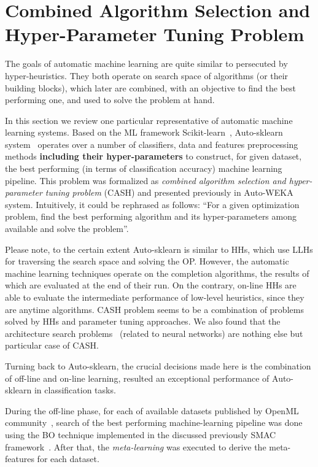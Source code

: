 \section{Combined Algorithm Selection and Hyper-Parameter Tuning Problem}\label{bg: section cash}
The goals of automatic machine learning are quite similar to persecuted by hyper-heuristics. They both operate on search space of algorithms (or their building blocks), which later are combined, with an objective to find the best performing one, and used to solve the problem at hand. 

In this section we review one particular representative of automatic machine learning systems.
Based on the ML framework Scikit-learn~\cite{scikit-learn}, Auto-sklearn system~\cite{feurer2015efficient} operates over a number of classifiers, data and features preprocessing methods \textbf{including their hyper-parameters} to construct, for given dataset, the best performing (in terms of classification accuracy) machine learning pipeline.
This problem was formalized as \textit{combined algorithm selection and hyper-parameter tuning problem} (CASH) and presented previously in Auto-WEKA~\cite{thornton2013auto} system. Intuitively, it could be rephrased as follows: ``For a given optimization problem, find the best performing algorithm and its hyper-parameters among available and solve the problem''. 

Please note, to the certain extent Auto-sklearn is similar to HHs, which use LLHs for traversing the search space and solving the OP. However, the automatic machine learning techniques operate on the completion algorithms, the results of which are evaluated at the end of their run. On the contrary, on-line HHs are able to evaluate the intermediate performance of low-level heuristics, since they are anytime algorithms.
CASH problem seems to be a combination of problems solved by HHs and parameter tuning approaches. We also found that the architecture search problems~\cite{elsken2018neural} (related to neural networks) are nothing else but particular case of CASH.


Turning back to Auto-sklearn, the crucial decisions made here is the combination of off-line and on-line learning, resulted an exceptional performance of Auto-sklearn in classification tasks.

During the off-line phase, for each of available datasets published by OpenML community~\cite{OpenMLPython2019}, search of the best performing machine-learning pipeline was done using the BO technique implemented in the discussed previously SMAC framework~\cite{hutter2011sequential}.
After that, the \textit{meta-learning} was executed to derive the meta-features for each dataset.

